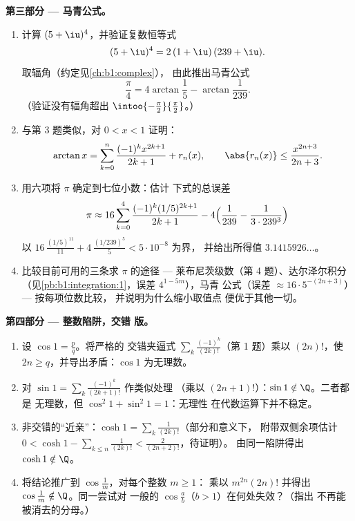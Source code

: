 \begin{problem}
\medskip
\noindent\textbf{第三部分 --- 马青公式。}
\begin{enumerate}[resume]
  \item 计算 $(5 + \iu)^4$，并验证复数恒等式
        \[
        (5 + \iu)^4 = 2\,(1 + \iu)\,(239 + \iu) .
        \]
        取辐角（约定见\cref{ch:b1:complex}），
        由此推出马青公式
        \[
        \frac\pi4 = 4\arctan\frac15 - \arctan\frac{1}{239} .
        \]
        （验证没有辐角超出
        $\intoo{-\frac\pi2}{\frac\pi2}$。）
  \item 与第 3 题类似，对 $0 < x < 1$ 证明：
        \[
        \arctan x = \sum_{k=0}^{n} \frac{(-1)^k
        x^{2k+1}}{2k+1} + r_n(x), \qquad \abs{r_n(x)} \leq
        \frac{x^{2n+3}}{2n+3} .
        \]
  \item 用六项将 $\pi$ 确定到七位小数：估计
        下式的总误差
        \[
        \pi \approx 16\sum_{k=0}^{4}
        \frac{(-1)^k (1/5)^{2k+1}}{2k+1}
        - 4\Bigl(\frac{1}{239} - \frac{1}{3\cdot239^3}\Bigr)
        \]
        以 $16\,\frac{(1/5)^{11}}{11} +
        4\,\frac{(1/239)^5}{5} < 5\cdot10^{-8}$ 为界，
        并给出所得值 $3.1415926\dots$。
  \item 比较目前可用的三条求 $\pi$ 的途径 ---
        莱布尼茨级数（第 4 题）、达尔泽尔积分
        （见\cref{pb:b1:integration:1}，误差 $4^{1-5m}$），马青
        公式（误差 $\approx 16\cdot 5^{-(2n+3)}$）--- 按每项位数比较，
        并说明为什么缩小取值点
        便优于其他一切。
\end{enumerate}

\medskip
\noindent\textbf{第四部分 --- 整数陷阱，交错
版。}
\begin{enumerate}[resume]
  \item 设 $\cos 1 = \frac pq$。将严格的
        交错夹逼式 $\sum_{k}
        \frac{(-1)^k}{(2k)!}$（第 1 题）乘以 $(2n)!$，使 $2n
        \geq q$，并导出矛盾：$\cos 1$
        为无理数。
  \item 对 $\sin 1 = \sum_k \frac{(-1)^k}{(2k+1)!}$ 作类似处理
        （乘以 $(2n+1)!$）：$\sin 1 \notin \Q$。二者都是
        无理数，但 $\cos^2 1 + \sin^2 1 = 1$：无理性
        在代数运算下并不稳定。
  \item 非交错的“近亲”：$\cosh 1 = \sum_k
        \frac{1}{(2k)!}$（部分和意义下，
        附带双侧余项估计 $0 < \cosh 1 - \sum_{k \leq n}
        \frac{1}{(2k)!} < \frac{2}{(2n+2)!}$，待证明）。
        由同一陷阱得出 $\cosh 1 \notin \Q$。
  \item 将结论推广到 $\cos\frac 1m$，对每个整数 $m \geq 1$：
        乘以 $m^{2n}(2n)!$ 并得出 $\cos\frac1m
        \notin \Q$。同一尝试对
        一般的 $\cos\frac ab$（$b > 1$）在何处失效？（指出
        不再能被消去的分母。）
\end{enumerate}


\end{problem}
